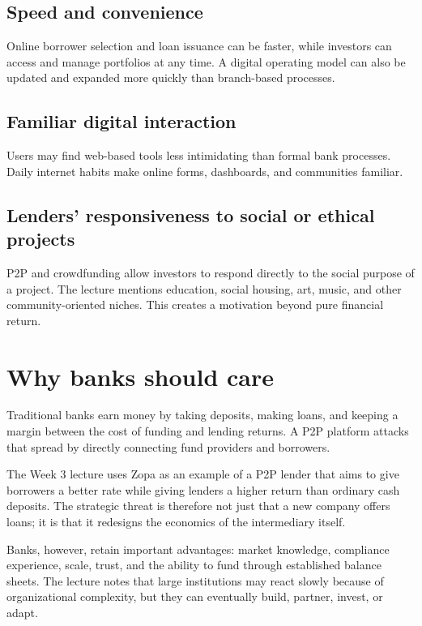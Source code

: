 \subsection{Speed and convenience}

Online borrower selection and loan issuance can be faster, while investors can access and manage portfolios at any time. A digital operating model can also be updated and expanded more quickly than branch-based processes.

\subsection{Familiar digital interaction}

Users may find web-based tools less intimidating than formal bank processes. Daily internet habits make online forms, dashboards, and communities familiar.

\subsection{Lenders' responsiveness to social or ethical projects}

P2P and crowdfunding allow investors to respond directly to the social purpose of a project. The lecture mentions education, social housing, art, music, and other community-oriented niches. This creates a motivation beyond pure financial return.

\section{Why banks should care}

Traditional banks earn money by taking deposits, making loans, and keeping a margin between the cost of funding and lending returns. A P2P platform attacks that spread by directly connecting fund providers and borrowers.

The Week 3 lecture uses Zopa as an example of a P2P lender that aims to give borrowers a better rate while giving lenders a higher return than ordinary cash deposits. The strategic threat is therefore not just that a new company offers loans; it is that it redesigns the economics of the intermediary itself.

Banks, however, retain important advantages: market knowledge, compliance experience, scale, trust, and the ability to fund through established balance sheets. The lecture notes that large institutions may react slowly because of organizational complexity, but they can eventually build, partner, invest, or adapt.

